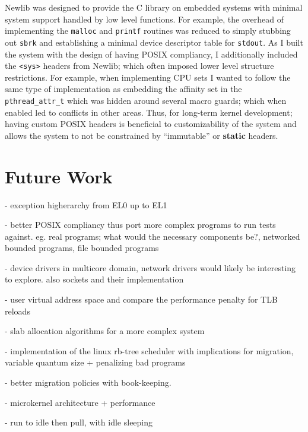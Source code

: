 \documentclass[11pt]{article}
\begin{document}
Newlib was designed to provide the C library on embedded systems \cite{newlib} with minimal system support handled by low level functions.  For example, the overhead of implementing the \texttt{malloc} and \texttt{printf} routines was reduced to simply stubbing out \texttt{sbrk} and establishing a minimal device descriptor table for \texttt{stdout}.  As I built the system with the design of having POSIX compliancy, I additionally included the \texttt{<sys>} headers from Newlib; which often imposed lower level structure restrictions.  For example, when implementing CPU sets I wanted to follow the same type of implementation as embedding the affinity set in the \texttt{pthread\_attr\_t} which was hidden around several macro guards; which when enabled led to conflicts in other areas.  Thus, for long-term kernel development; having custom POSIX headers is beneficial to customizability of the system and allows the system to not be constrained by ``immutable'' or \textbf{static} headers.

\section{Future Work}
\label{sec:future}
- exception higherarchy from EL0 up to EL1

- better POSIX compliancy thus port more complex programs to run tests against.
eg. real programs; what would the necessary components be?, networked bounded programs, file bounded programs

- device drivers in multicore domain, network drivers would likely be interesting to explore.  also sockets and their implementation

- user virtual address space and compare the performance penalty for TLB reloads

- slab allocation algorithms for a more complex system

- implementation of the linux rb-tree scheduler with implications for migration, variable quantum size + penalizing bad programs

- better migration policies with book-keeping.

- microkernel architecture + performance

- run to idle then pull, with idle sleeping


\onecolumn
\begin{sloppypar}
	
	
\end{sloppypar}

\end{document}
